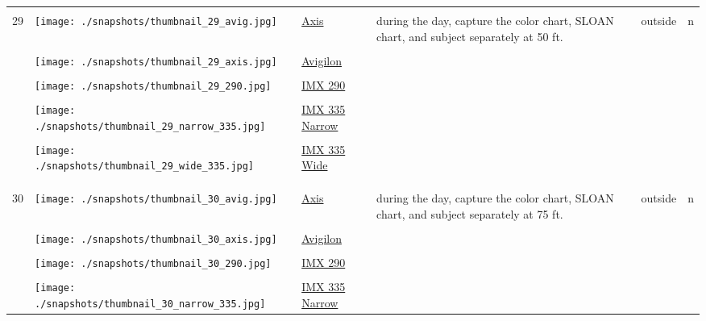 \documentclass{article}%
\begin{document}
\begin{longtabu}{m{2.5cm} m{4cm} m{2cm} m{4cm} m{2cm} m{2cm}}
&&&&&\\%
\hline%
&&&&&\\%
29&\texttt{[image: ./snapshots/thumbnail\_29\_avig.jpg]}&\href{https://drive.google.com/file/d/1A8bb2ZhAel2Dzxs6RZn98LkgYMb-dRRa/view?usp=sharing}{Axis}&during the day, capture the color chart, SLOAN chart, and subject separately at 50 ft.&outside&n\\%
&&&&&\\%
&\texttt{[image: ./snapshots/thumbnail\_29\_axis.jpg]}&\href{https://drive.google.com/file/d/1f293NRKOXEMXiNMW7CCLtVVFHFLtdeqr/view?usp=sharing}{Avigilon}&&&\\%
&&&&&\\%
&\texttt{[image: ./snapshots/thumbnail\_29\_290.jpg]}&\href{https://drive.google.com/file/d/1b40azbbFnXwDWgg_NyUB7nRJQA4LEJnt/view?usp=sharing}{IMX 290}&&&\\%
&&&&&\\%
&\texttt{[image: ./snapshots/thumbnail\_29\_narrow\_335.jpg]}&\href{https://drive.google.com/file/d/1C6KwgQPezLFlMDNt8QUyUVuRU9H7s2F6/view?usp=sharing}{IMX 335 Narrow}&&&\\%
&&&&&\\%
&\texttt{[image: ./snapshots/thumbnail\_29\_wide\_335.jpg]}&\href{https://drive.google.com/file/d/1EPdwds0dgAMoAoiZEL2MWgSOyViSm9ht/view?usp=sharing}{IMX 335 Wide}&&&\\%
&&&&&\\%
&&&&&\\%
\hline%
&&&&&\\%
30&\texttt{[image: ./snapshots/thumbnail\_30\_avig.jpg]}&\href{https://drive.google.com/file/d/15nyU6uBKe6zKD-dEezt7OkeuzLYKIaJN/view?usp=sharing}{Axis}&during the day, capture the color chart, SLOAN chart, and subject separately at 75 ft.&outside&n\\%
&&&&&\\%
&\texttt{[image: ./snapshots/thumbnail\_30\_axis.jpg]}&\href{https://drive.google.com/file/d/1ciGcys68b6MeliPgYgnIuaCuMBD3HwPB/view?usp=sharing}{Avigilon}&&&\\%
&&&&&\\%
&\texttt{[image: ./snapshots/thumbnail\_30\_290.jpg]}&\href{https://drive.google.com/file/d/1MvzLJEXitJo3j0HWRoMQYG9CBBCgGI0j/view?usp=sharing}{IMX 290}&&&\\%
&&&&&\\%
&\texttt{[image: ./snapshots/thumbnail\_30\_narrow\_335.jpg]}&\href{https://drive.google.com/file/d/1XepXsWPqrQ5-7NPvB8dNFI8eV7vM3WqP/view?usp=sharing}{IMX 335 Narrow}&&&\\%

\end{longtabu}
\end{document}
